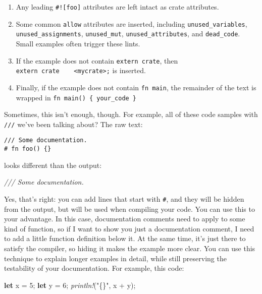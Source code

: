 \documentclass[a4paper,]{book}
\newenvironment{Shaded}{\begin{snugshade}}{\end{snugshade}}
\newcommand{\KeywordTok}[1]{\textcolor[rgb]{0.13,0.29,0.53}{\textbf{{#1}}}}
\newcommand{\DecValTok}[1]{\textcolor[rgb]{0.00,0.00,0.81}{{#1}}}
\newcommand{\StringTok}[1]{\textcolor[rgb]{0.31,0.60,0.02}{{#1}}}
\newcommand{\CommentTok}[1]{\textcolor[rgb]{0.56,0.35,0.01}{\textit{{#1}}}}
\newcommand{\PreprocessorTok}[1]{\textcolor[rgb]{0.56,0.35,0.01}{\textit{{#1}}}}
\newcommand{\NormalTok}[1]{{#1}}
\providecommand{\tightlist}{%
  \setlength{\itemsep}{0pt}\setlength{\parskip}{0pt}}
\begin{document}
\begin{enumerate}
\def\labelenumi{\arabic{enumi}.}
\tightlist
\item
  Any leading \texttt{\#!{[}foo{]}} attributes are left intact as crate
  attributes.
\item
  Some common \texttt{allow} attributes are inserted, including
  \texttt{unused\_variables}, \texttt{unused\_assignments},
  \texttt{unused\_mut}, \texttt{unused\_attributes}, and
  \texttt{dead\_code}. Small examples often trigger these lints.
\item
  If the example does not contain \texttt{extern\ crate}, then
  \texttt{extern\ crate\ \ \ \ \textless{}mycrate\textgreater{};} is
  inserted.
\item
  Finally, if the example does not contain \texttt{fn\ main}, the
  remainder of the text is wrapped in
  \texttt{fn\ main()\ \{\ your\_code\ \}}
\end{enumerate}

Sometimes, this isn't enough, though. For example, all of these code
samples with \texttt{///} we've been talking about? The raw text:

\begin{verbatim}
/// Some documentation.
# fn foo() {}
\end{verbatim}

looks different than the output:

\begin{Shaded}
\begin{Highlighting}[]
\CommentTok{/// Some documentation.}
\end{Highlighting}
\end{Shaded}

Yes, that's right: you can add lines that start with \texttt{\#}, and
they will be hidden from the output, but will be used when compiling
your code. You can use this to your advantage. In this case,
documentation comments need to apply to some kind of function, so if I
want to show you just a documentation comment, I need to add a little
function definition below it. At the same time, it's just there to
satisfy the compiler, so hiding it makes the example more clear. You can
use this technique to explain longer examples in detail, while still
preserving the testability of your documentation. For example, this
code:

\begin{Shaded}
\begin{Highlighting}[]
\KeywordTok{let} \NormalTok{x = }\DecValTok{5}\NormalTok{;}
\KeywordTok{let} \NormalTok{y = }\DecValTok{6}\NormalTok{;}
\PreprocessorTok{println!}\NormalTok{(}\StringTok{"\{\}"}\NormalTok{, x + y);}
\end{Highlighting}
\end{Shaded}
\end{document}
